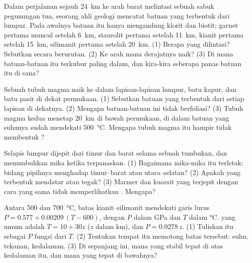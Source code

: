 \begin{exercise}[$\star\star$]\label{exo:g12:metamorphic-rocks:9}
Dalam perjalanan sejauh \qty{24}{km} ke arah barat melintasi sebuah sabuk
pegunungan tua, seorang ahli geologi mencatat batuan yang terbentuk dari
lumpur. Pada awalnya batuan itu hanya mengandung klorit dan biotit; garnet
pertama muncul setelah \qty{6}{km}, staurolit pertama setelah \qty{11}{km},
kianit pertama setelah \qty{15}{km}, silimanit pertama setelah \qty{20}{km}.
(1) Berapa  yang dilintasi? Sebutkan secara berurutan. (2) Ke arah mana
derajatnya naik? (3) Di mana batuan-batuan itu terkubur paling dalam, dan
kira-kira seberapa panas batuan itu di sana?
\end{exercise}

\begin{exercise}[$\star\star$]\label{exo:g12:metamorphic-rocks:10}
Sebuah tubuh magma naik ke dalam lapisan-lapisan lumpur, batu kapur, dan batu
pasir di dekat permukaan. (1) Sebutkan batuan yang terbentuk dari setiap lapisan
di dekatnya. (2) Mengapa batuan-batuan ini tidak berfoliasi? (3) Tubuh magma
kedua menetap \qty{20}{km} di bawah permukaan, di dalam batuan yang suhunya
sudah mendekati \qty{500}{\celsius}. Mengapa tubuh magma itu hampir tidak
membentuk ?
\end{exercise}

\begin{exercise}[$\star\star$]\label{exo:g12:metamorphic-rocks:11}
Selapis lumpur dijepit dari timur dan barat selama sebuah tumbukan, dan
menumbuhkan mika ketika terpanaskan. (1) Bagaimana mika-mika itu terletak:
bidang pipihnya menghadap timur--barat atau utara--selatan? (2) Apakah 
yang terbentuk mendatar atau tegak? (3) Marmer dan kuarsit yang terjepit dengan
cara yang sama tidak memperlihatkan . Mengapa?
\end{exercise}

\begin{exercise}[$\star\star\star$]\label{exo:g12:metamorphic-rocks:12}
Antara 500 dan \qty{700}{\celsius}, batas kianit--silimanit mendekati garis
lurus $P = 0.577 + 0.00209\,(T - 600)$, dengan $P$ dalam
\unit{GPa} dan $T$ dalam \unit{\celsius}.  yang umum adalah $T = 10 + 30z$
($z$ dalam \unit{km}), dan $P = 0.0278\,z$. (1) Tuliskan  itu sebagai $P$
fungsi dari $T$. (2) Tentukan tempat  itu memotong batas tersebut: suhu,
tekanan, kedalaman. (3) Di sepanjang  ini,  mana yang stabil
tepat di atas kedalaman itu, dan mana yang tepat di bawahnya?
\end{exercise}


